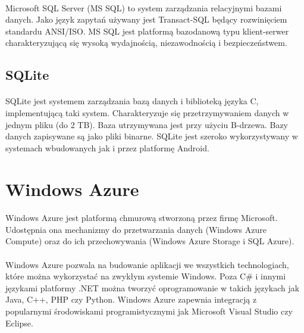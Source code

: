 \paragraph{}
Microsoft SQL Server \cite{sql} (MS SQL) to system zarządzania relacyjnymi bazami danych. Jako język zapytań używany jest Transact-SQL będący rozwinięciem standardu ANSI/ISO. MS SQL jest platformą bazodanową typu klient-serwer charakteryzującą się wysoką wydajnością, niezawodnością i bezpieczeństwem.

\subsection{SQLite} %
\label{sub:sqlite}
\paragraph{} %
SQLite jest systemem zarządzania bazą danych i biblioteką języka C, implementującą taki system. Charakteryzuje się przetrzymywaniem danych w jednym pliku (do 2 TB). Baza utrzymywana jest przy użyciu B-drzewa. Bazy danych zapisywane są jako pliki binarne. SQLite jest szeroko wykorzystywany w systemach wbudowanych jak i przez platformę Android.

\section{Windows Azure} %

\paragraph{} %
Windows Azure \cite{azure} jest platformą chmurową stworzoną przez firmę Microsoft. Udostępnia ona mechanizmy do przetwarzania danych (Windows Azure Compute) oraz do ich przechowywania (Windows Azure Storage  i SQL Azure).
\paragraph{} %
\label{par:}

Windows Azure pozwala na budowanie aplikacji we wszystkich technologiach, które można wykorzystać na zwykłym systemie Windows. Poza C\# i innymi językami platformy .NET można tworzyć oprogramowanie w takich językach jak Java, C++, PHP czy Python. Windows Azure zapewnia integracją z popularnymi środowiskami programistycznymi jak Microsoft Visual Studio czy Eclipse.
\paragraph{} %
\label{par:}

